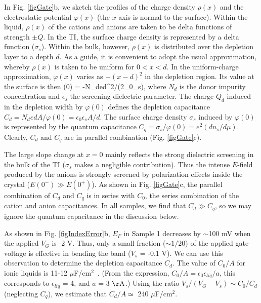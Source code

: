 In Fig. \ref{figGate}b, we sketch the profiles of the charge density $\rho(x)$ and the 
electrostatic potential $\varphi(x)$ (the $x$-axis is normal to the surface). 
Within the liquid, $\rho(x)$ of the cations and anions are taken to 
be delta functions of strength $\pm Q$. In the TI, the surface charge density is represented by
a delta function ($\sigma_s$). Within the bulk, however, $\rho(x)$ is distributed 
over the depletion layer to a depth $d$. As a guide, it is convenient to adopt the usual approximation, 
whereby $\rho(x)$ is taken to be uniform for $0<x<d$. 
In the uniform-charge approximation, $\varphi(x)$ varies as $-(x-d)^2$ in the depletion region.
Its value at the surface is then
\be
\varphi(0) = -N_ded^2/(2\epsilon_0\epsilon_s),
\label{phi0}
\ee
where $N_d$ is the donor impurity concentration and $\epsilon_s$ the screening dielectric parameter.
The charge $Q_d$ induced in the depletion width by $\varphi(0)$ defines the depletion capacitance
$C_d = N_dedA/\varphi(0) = \epsilon_0\epsilon_s A/d$. The surface charge density $\sigma_s$ 
induced by $\varphi(0)$ is represented by the quantum capacitance
$C_q = \sigma_s/\varphi(0) = e^2(dn_s/d\mu)$. Clearly, $C_d$ and $C_q$ are in parallel
combination (Fig. \ref{figGate}c).

The large slope change at $x=0$ mainly reflects the strong dielectric screening in the bulk of the
TI ($\sigma_s$ makes a negligible contribution). Thus the intense $E$-field produced by the
anions is strongly screened by polarization effects inside the crystal ($E(0^-)\gg E(0^+)$). 
As shown in Fig. \ref{figGate}c, the parallel combination of $C_d$ and $C_q$ is in 
series with $C_0$, the series combination of the cation and anion capacitances.
In all samples, we find that $C_d\gg C_q$, so we may ignore the quantum capacitance in the discussion below.

As shown in Fig. \ref{figIndexError}b, $E_F$ in Sample 1 decreases by $\sim$100 mV when the applied $V_G$ is -2 V.
Thus, only a small fraction ($\sim 1/20$) of the applied gate voltage is effective in bending the band ($V_s$ = -0.1 V).
We can use this observation to determine the depletion capacitance $C_d$.
The value of $C_0/A$ for ionic liquids is 11-12 $\mu$F/cm$^2$~\cite{Koch}.
(From the expression, $C_0/A = \epsilon_0\epsilon_{liq}/a$, this corresponds to $\epsilon_{liq}$ = 4, and $a$ = 3 $\rm\AA$.) 
Using the ratio $V_s/(V_G-V_s)\sim C_0/C_d$ (neglecting $C_q$), we estimate that $C_d/A\simeq$ 240 $\mu$F/cm$^2$.

